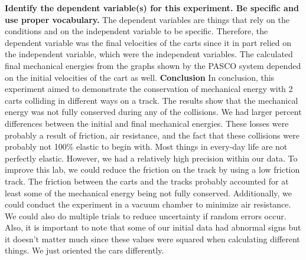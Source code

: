 \documentclass{article}
\begin{document}
\textbf{Identify the dependent variable(s) for this experiment.
Be specific and use proper vocabulary.} \vspace{0.25cm}
\newline
The dependent variables are things that rely on the conditions and on the independent variable to be specific. Therefore, the dependent variable was the final velocities of the carts since it in part relied on the independent variable, which were the independent variables. The calculated final mechanical energies from the graphs shown by the PASCO system depended on the initial velocities of the cart as well. \vspace{0.5cm}
\newline
\textbf{Conclusion} \vspace{0.25cm}
\newline
In conclusion, this experiment aimed to demonstrate the conservation of mechanical energy with 2 carts colliding in different ways on a track. The results show that the mechanical energy was not fully conserved during any of the collisions. We had larger percent differences between the initial and final mechanical energies. These losses were probably a result of friction, air resistance, and the fact that these collisions were probably not 100\% elastic to begin with. Most things in every-day life are not perfectly elastic. However, we had a relatively high precision within our data. To improve this lab, we could reduce the friction on the track by using a low friction track. The friction between the carts and the tracks probably accounted for at least some of the mechanical energy being not fully conserved. Additionally, we could conduct the experiment in a vacuum chamber to minimize air resistance. We could also do multiple trials to reduce uncertainty if random errors occur. 
\newline 
Also, it is important to note that some of our initial data had abnormal signs but it doesn't matter much since these values were squared when calculating different things. We just oriented the cars differently. 
\end{document}
